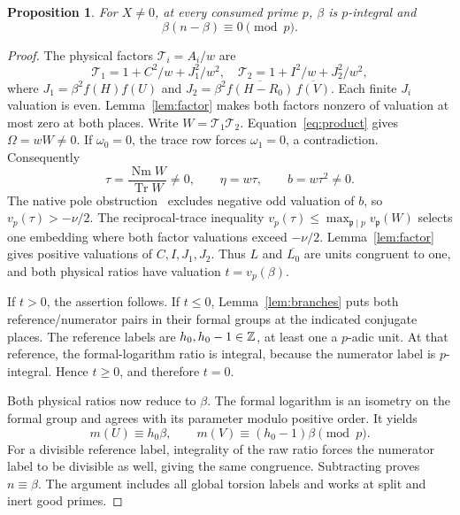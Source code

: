\documentclass[11pt,a4paper]{article}
\newtheorem{proposition}[theorem]{Proposition}
\DeclareMathOperator{\Tr}{Tr}\DeclareMathOperator{\Nm}{Nm}
\begin{document}
\begin{proposition}\label{prop:local}
For $X\ne0$, at every consumed prime $p$, $\beta$ is $p$-integral and
\[
                         \beta(n-\beta)\equiv0\pmod p.
\]
\end{proposition}
\begin{proof}
The physical factors $\mathcal T_i=A_i/w$ are
\[
 \mathcal T_1=1+C^2/w+J_1^2/w^2,\quad
 \mathcal T_2=1+I^2/w+J_2^2/w^2,
\]
where $J_1=\beta^2f(H)f(U)$ and
$J_2=\beta^2\overline{f(H-R_0)}\,\overline{f(V)}$.
Each finite $J_i$ valuation is even. Lemma~\ref{lem:factor}
makes both factors nonzero of valuation at most zero at both places.
Write $W=\mathcal T_1\mathcal T_2$.
Equation~\eqref{eq:product} gives $\Omega=wW\ne0$.
If $\omega_0=0$, the trace row forces $\omega_1=0$, a contradiction.
Consequently
\begin{equation}\label{eq:physical}
 \tau=\frac{\Nm W}{\Tr W}\ne0,\qquad
 \eta=w\tau,\qquad b=w\tau^2\ne0.
\end{equation}
The native pole obstruction~\cite{Pole} excludes negative odd
valuation of $b$, so $v_p(\tau)>-\nu/2$.
The reciprocal-trace inequality
$v_p(\tau)\le\max_{\mathfrak p\mid p}v_{\mathfrak p}(W)$
selects one embedding where both factor valuations exceed $-\nu/2$.
Lemma~\ref{lem:factor} gives positive valuations of $C,I,J_1,J_2$.
Thus $L$ and $\overline{L_0}$ are units congruent to one, and both
physical ratios have valuation $t=v_p(\beta)$.

If $t>0$, the assertion follows. If $t\le0$,
Lemma~\ref{lem:branches} puts both reference/numerator pairs in their
formal groups at the indicated conjugate places. The reference labels
are $h_0,h_0-1\in\mathbb Z$, at least one a $p$-adic unit.
At that reference, the formal-logarithm ratio is integral, because
the numerator label is $p$-integral. Hence $t\ge0$, and therefore
$t=0$.

Both physical ratios now reduce to $\beta$. The formal logarithm
is an isometry on the formal group and agrees with its parameter
modulo positive order. It yields
\[
 m(U)\equiv h_0\beta,\qquad
 m(V)\equiv(h_0-1)\beta\pmod p.
\]
For a divisible reference label, integrality of the raw ratio forces
the numerator label to be divisible as well, giving the same congruence.
Subtracting proves $n\equiv\beta$. The argument includes all global
torsion labels and works at split and inert good primes.
\end{proof}
\end{document}
